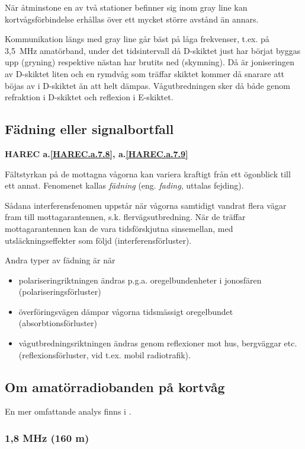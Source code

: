 När åtminstone en av två stationer befinner sig inom gray line kan
kortvågsförbindelse erhållas över ett mycket större avstånd än annars.

Kommunikation längs med gray line går bäst på låga frekvenser,
t.ex. på 3,5~MHz amatörband, under det tidsintervall då D-skiktet just
har börjat byggas upp (gryning) respektive nästan har brutits ned (skymning).
Då är joniseringen av D-skiktet liten och en rymdvåg som
träffar skiktet kommer då snarare att böjas av i D-skiktet än att helt dämpas.
Vågutbredningen sker då både genom refraktion i D-skiktet och reflexion i
E-skiktet.

\subsection{Fädning eller signalbortfall}
\textbf{
HAREC a.\ref{HAREC.a.7.8}\label{myHAREC.a.7.8},
 a.\ref{HAREC.a.7.9}\label{myHAREC.a.7.9}
}

Fältstyrkan på de mottagna vågorna kan variera kraftigt från ett ögonblick till
ett annat.
Fenomenet kallas \emph{fädning} (eng. \emph{fading}, uttalas fejding).

Sådana interferensfenomen uppstår när vågorna samtidigt vandrat flera
vägar fram till mottagarantennen, s.k. flervägsutbredning.
När de träffar mottagarantennen kan de vara tidsförskjutna sinsemellan, med
utsläckningseffekter som följd (interferensförluster).

Andra typer av fädning är när
\begin{itemize}
\item polariseringriktningen ändras p.g.a. oregelbundenheter i
  jonosfären (polariseringsförluster)
\item överföringsvägen dämpar vågorna tidsmässigt oregelbundet
  (absorbtionsförluster)
\item vågutbredningsriktningen ändras genom reflexioner mot hus,
  bergväggar etc. (reflexionsförluster, vid t.ex. mobil radiotrafik).
\end{itemize}

\subsection{Om amatörradiobanden på kortvåg}

En mer omfattande analys finns i \cite{ARRLHDB2015}.

\subsubsection{1,8 MHz (160 m)}

